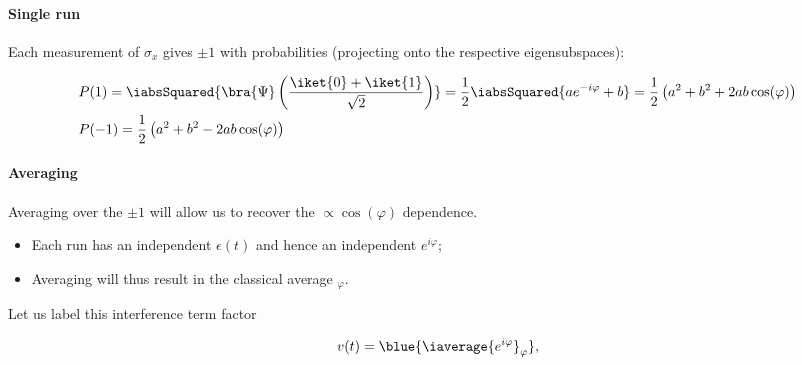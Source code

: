  \newpage
  \paragraph{Single run} Each measurement of $ \sigma_x $ gives $ \pm1 $ with probabilities (projecting onto the respective eigensubspaces):
  
  \begin{equation}\label{key}
  	\begin{aligned}
  		&P(1) = \iabsSquared{\bra{\Psi}\left(\frac{\iket{0} + \iket{1}}{\sqrt{2}}\right)} = \frac{1}{{2}}\iabsSquared{ae^{-i\varphi} + b} = \frac{1}{2}\left({a}^2 + {b}^2 + 2ab\cos(\varphi) \right)\\
  		& P(-1) = \frac{1}{2}\left(a^2 + b^2 - 2ab\cos(\varphi)\right)
  	\end{aligned}
  \end{equation}
    
  
  \paragraph{Averaging} Averaging over the $ \pm 1 $ will allow us to recover the \isigmax $ \propto \cos(\varphi) $ dependence.
  \begin{itemize}
  	\item Each run has an independent $ \epsilon(t) $ and hence an independent $ e^{i\varphi} $;
  	\item Averaging will thus result in the classical average $ _\varphi $.
  \end{itemize}

  
  \noindent Let us label this interference term factor
  
  \begin{equation}\label{key}
  	v(t) = \blue{\iaverage{e^{i\varphi}}_\varphi},
  \end{equation}
  
